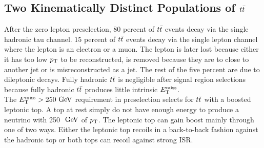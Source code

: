\subsection{Two Kinematically Distinct Populations of $t\bar{t}$}
\label{sec:Bkg:ttbar:Pop}

\indent After the zero lepton preselection, 80 percent of $t\bar{t}$ events decay via the single hadronic tau channel.  $15$ percent of $t\bar{t}$ events decay via the single lepton channel where the lepton is an electron or a muon.  The lepton is later lost because either it has too low $p_{\mathrm{T}}$ to be reconstructed, is removed because they are to close to another jet or is misreconstructed as a jet. The rest of the five percent are due to dileptonic decays. Fully hadronic $t\bar{t}$ is negligible after signal region selections because fully hadronic $t\bar{t}$ produces little intrinsic $E_{\mathrm{T}}^{\mathrm{miss}}$. \\

\indent  The $\met>250 \gev$ requirement in preselection selects for $t\bar{t}$ with a boosted leptonic top.  A top at rest simply do not have enough energy to produce a neutrino with 250 $\gev$ of $p_{\mathrm{T}}$. The leptonic top can gain boost mainly through one of two ways.  Either the leptonic top recoils in a back-to-back fashion against the hadronic top or both tops can recoil against strong ISR.  \\



